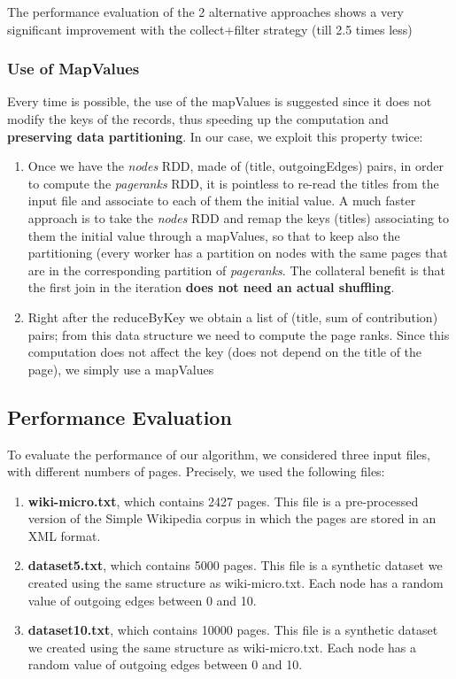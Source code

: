 \noindent The performance evaluation of the 2 alternative approaches shows a very significant improvement with the collect+filter strategy (till 2.5 times less) 

\subsubsection{Use of MapValues}
Every time is possible, the use of the mapValues is suggested since it does not modify the keys of the records, thus speeding up the computation and \textbf{preserving data partitioning}. In our case, we exploit this property twice:

\begin{enumerate}
	\item Once we have the \textit{nodes} RDD, made of (title, outgoingEdges) pairs, in order to compute the \textit{pageranks} RDD, it is pointless to re-read the titles from the input file and associate to each of them the initial value. A much faster approach is to take the \textit{nodes} RDD and remap the keys (titles) associating to them the initial value through a mapValues, so that to keep also the partitioning (every worker has a partition on nodes with the same pages that are in the corresponding partition of \textit{pageranks}. The collateral benefit is that the first join in the iteration \textbf{does not need an actual shuffling}.
	\item Right after the reduceByKey we obtain a list of (title, sum of contribution) pairs; from this data structure we need to compute the page ranks. Since this computation does not affect the key (does not depend on the title of the page), we simply use a mapValues   
\end{enumerate}

\subsection{Performance Evaluation}
To evaluate the performance of our algorithm, we considered three input files, with different numbers of pages. Precisely, we used the following files:

\begin{enumerate}
	\item \textbf{wiki-micro.txt}, which contains 2427 pages. This file is a pre-processed version of the Simple Wikipedia corpus in which the pages are stored in an XML format.
	\item \textbf{dataset5.txt}, which contains 5000 pages. This file is a synthetic dataset we created using the same structure as wiki-micro.txt. Each node has a random value of outgoing edges between 0 and 10.
	\item \textbf{dataset10.txt}, which contains 10000 pages. This file is a synthetic dataset we created using the same structure as wiki-micro.txt. Each node has a random value of outgoing edges between 0 and 10.
\end{enumerate}

